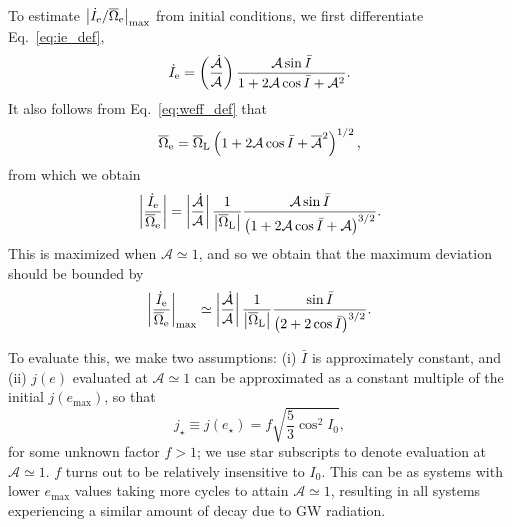 \documentclass[
        twocolumn,
        twocolappendix
    ]{aastex63}
\newcommand*{\abs}[1]{\left|#1\right|}
\newcommand*{\p}[1]{\left(#1\right)}
\begin{document}
To estimate $\abs{\dot{I}_{\rm e} / \overline{\Omega}_{\rm e}}_{\max}$ from
initial conditions, we first differentiate Eq.~\eqref{eq:ie_def},
\begin{equation}
    \dot{I}_{\rm e} = \p{\frac{\dot{\mathcal{A}}}{
            \mathcal{A}}}
        \frac{\mathcal{A} \sin \bar{I}}{
            1 + 2\mathcal{A}\cos \bar{I}
                + \mathcal{A}^2}.
\end{equation}
It also follows from Eq.~\eqref{eq:weff_def} that
\begin{equation}
    \overline{\Omega}_{\rm e} = \overline{\Omega}_{\rm L}
        \p{1 + 2\mathcal{A}\cos \bar{I}
            + \overline{\mathcal{A}}^2}^{1/2},
\end{equation}
from which we obtain
\begin{equation}
    \abs{\frac{\dot{I}_{\rm e}}{\overline{\Omega}_{\rm e}}}
        = \abs{\frac{\dot{\mathcal{A}}}{
            \mathcal{A}}}
        \frac{1}{\abs{\overline{\Omega}_{\rm L}}}
        \frac{\mathcal{A} \sin \bar{I}}{
            \p{1 + 2\mathcal{A}\cos \bar{I}
                + \mathcal{A}}^{3/2}}.
\end{equation}
This is maximized when $\mathcal{A} \simeq 1$, and so we obtain that
the maximum deviation should be bounded by
\begin{equation}
    \abs{\frac{\dot{I}_{\rm e}}{\overline{\Omega}_{\rm e}}}_{\max}
        \simeq \abs{\frac{\dot{\mathcal{A}}}{\mathcal{A}}}
            \frac{1}{\abs{\overline{\Omega}_{\rm L}}}
            \frac{\sin \bar{I}}{\p{2 + 2\cos \bar{I}}^{3/2}}.
            \label{eq:idot_over_W}
\end{equation}

To evaluate this, we make two assumptions: (i) $\bar{I}$ is approximately
constant, and (ii) $j(e)$ evaluated at $\mathcal{A} \simeq 1$ can be
approximated as a constant multiple of the initial $j(e_{\max})$, so that
\begin{equation}
    j_{\star} \equiv j(e_{\star}) = f
        \sqrt{\frac{5}{3}\cos^2 I_0},\label{eq:jstar_ansatz}
\end{equation}
for some unknown factor $f > 1$; we use star subscripts to denote evaluation at
$\mathcal{A} \simeq 1$. $f$ turns out to be relatively insensitive to $I_0$.
This can be as systems with lower $e_{\max}$ values taking more cycles to attain
$\mathcal{A} \simeq 1$, resulting in all systems experiencing a similar amount
of decay due to GW radiation.
\end{document}
